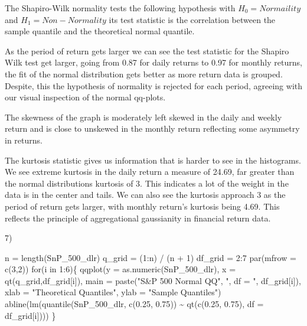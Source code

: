 \documentclass[
  letterpaper,
  DIV=11,
  numbers=noendperiod]{scrartcl}
\newenvironment{Shaded}{\begin{snugshade}}{\end{snugshade}}
\newcommand{\AttributeTok}[1]{\textcolor[rgb]{0.40,0.45,0.13}{#1}}
\newcommand{\ControlFlowTok}[1]{\textcolor[rgb]{0.00,0.23,0.31}{#1}}
\newcommand{\DecValTok}[1]{\textcolor[rgb]{0.68,0.00,0.00}{#1}}
\newcommand{\FloatTok}[1]{\textcolor[rgb]{0.68,0.00,0.00}{#1}}
\newcommand{\FunctionTok}[1]{\textcolor[rgb]{0.28,0.35,0.67}{#1}}
\newcommand{\NormalTok}[1]{\textcolor[rgb]{0.00,0.23,0.31}{#1}}
\newcommand{\OtherTok}[1]{\textcolor[rgb]{0.00,0.23,0.31}{#1}}
\newcommand{\SpecialCharTok}[1]{\textcolor[rgb]{0.37,0.37,0.37}{#1}}
\newcommand{\StringTok}[1]{\textcolor[rgb]{0.13,0.47,0.30}{#1}}
\begin{document}
The Shapiro-Wilk normality tests the following hypothesis with
\(H_0=Normaility\) and \(H_1=Non-Normality\) its test statistic is the
correlation between the sample quantile and the theoretical normal
quantile.

As the period of return gets larger we can see the test statistic for
the Shapiro Wilk test get larger, going from 0.87 for daily returns to
0.97 for monthly returns, the fit of the normal distribution gets better
as more return data is grouped. Despite, this the hypothesis of
normality is rejected for each period, agreeing with our visual
inspection of the normal qq-plots.

The skewness of the graph is moderately left skewed in the daily and
weekly return and is close to unskewed in the monthly return reflecting
some asymmetry in returns.

The kurtosis statistic gives us information that is harder to see in the
histograms. We see extreme kurtosis in the daily return a measure of
24.69, far greater than the normal distributions kurtosis of 3. This
indicates a lot of the weight in the data is in the center and tails. We
can also see the kurtosis approach 3 as the period of return gets
larger, with monthly return's kurtosis being 4.69. This reflects the
principle of aggregational gaussianity in financial return data.

7)

\begin{Shaded}
\begin{Highlighting}[]
\NormalTok{n }\OtherTok{=} \FunctionTok{length}\NormalTok{(SnP\_500\_dlr)}
\NormalTok{q\_grid }\OtherTok{=}\NormalTok{ (}\DecValTok{1}\SpecialCharTok{:}\NormalTok{n) }\SpecialCharTok{/}\NormalTok{ (n }\SpecialCharTok{+} \DecValTok{1}\NormalTok{)}
\NormalTok{df\_grid }\OtherTok{=} \DecValTok{2}\SpecialCharTok{:}\DecValTok{7}
\FunctionTok{par}\NormalTok{(}\AttributeTok{mfrow =} \FunctionTok{c}\NormalTok{(}\DecValTok{3}\NormalTok{,}\DecValTok{2}\NormalTok{))}
\ControlFlowTok{for}\NormalTok{(i }\ControlFlowTok{in} \DecValTok{1}\SpecialCharTok{:}\DecValTok{6}\NormalTok{)\{}
 \FunctionTok{qqplot}\NormalTok{(}\AttributeTok{y =} \FunctionTok{as.numeric}\NormalTok{(SnP\_500\_dlr), }\AttributeTok{x =} \FunctionTok{qt}\NormalTok{(q\_grid,df\_grid[i]),}
 \AttributeTok{main =} \FunctionTok{paste}\NormalTok{(}\StringTok{"S\&P 500 Normal QQ"}\NormalTok{, }\StringTok{", df = "}\NormalTok{, df\_grid[i]), }
 \AttributeTok{xlab =} \StringTok{"Theoretical Quantiles"}\NormalTok{, }\AttributeTok{ylab =} \StringTok{"Sample Quantiles"}\NormalTok{)}
  \FunctionTok{abline}\NormalTok{(}\FunctionTok{lm}\NormalTok{(}\FunctionTok{quantile}\NormalTok{(SnP\_500\_dlr, }\FunctionTok{c}\NormalTok{(}\FloatTok{0.25}\NormalTok{, }\FloatTok{0.75}\NormalTok{)) }\SpecialCharTok{\textasciitilde{}} 
             \FunctionTok{qt}\NormalTok{(}\FunctionTok{c}\NormalTok{(}\FloatTok{0.25}\NormalTok{, }\FloatTok{0.75}\NormalTok{), }\AttributeTok{df =}\NormalTok{ df\_grid[i])))}
\NormalTok{\}}
\end{Highlighting}
\end{Shaded}
\end{document}
